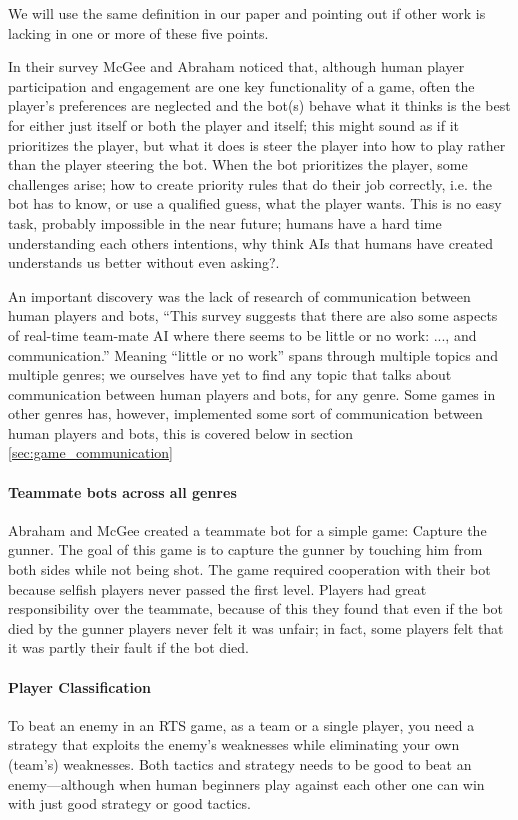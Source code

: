 We will use the same definition in our paper and pointing out if other work is lacking in one or more of these five points.

In their survey\cite{mcgee10} McGee and Abraham noticed that, although human player participation and engagement are one key functionality of a game\cite{reynolds03}, often the player's preferences are neglected and the bot(s) behave what it thinks is the best for either just itself or both the player and itself; this might sound as if it prioritizes the player, but what it does is steer the player into how to play rather than the player steering the bot. When the bot prioritizes the player, some challenges arise; how to create priority rules that do their job correctly\cite{mcgee10}, i.e. the bot has to know, or use a qualified guess, what the player wants. This is no easy task, probably impossible in the near future; humans have a hard time understanding each others intentions, why think AIs that humans have created understands us better\cite{norman07} without even asking?.

An important discovery was the lack of research of communication between human players and bots, “This survey suggests that there are also some aspects of real-time team-mate AI where there seems to be little or no work: ..., and communication.”\cite{mcgee10} Meaning “little or no work” spans through multiple topics and multiple genres; we ourselves have yet to find any topic that talks about communication between human players and bots, for any genre. Some games in other genres has, however, implemented some sort of communication between human players and bots, this is covered below in section \ref{sec:game_communication}

\paragraph{Teammate bots across all genres}
Abraham and McGee created a teammate bot for a simple game: Capture the gunner\cite{abraham10}. The goal of this game is to capture the gunner by touching him from both sides while not being shot. The game required cooperation with their bot because selfish players never passed the first level. Players had great responsibility over the teammate, because of this they found that even if the bot died by the gunner players never felt it was unfair; in fact, some players felt that it was partly their fault if the bot died.


\paragraph{Player Classification}
To beat an enemy in an RTS game, as a team or a single player, you need a strategy that exploits the enemy’s weaknesses while eliminating your own (team’s) weaknesses. Both tactics and strategy needs to be good to beat an enemy—although when human beginners play against each other one can win with just good strategy or good tactics.

